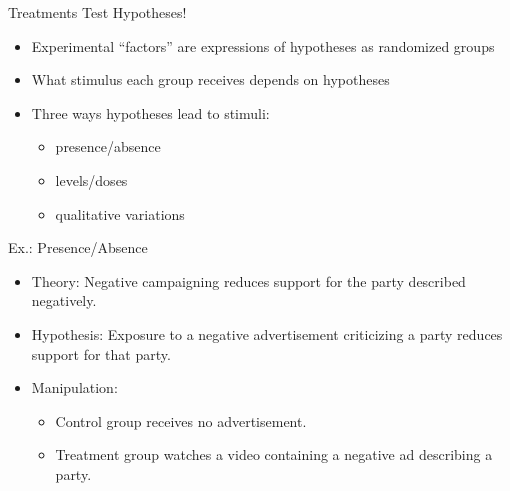 \documentclass[
  ignorenonframetext,
]{beamer}
\providecommand{\tightlist}{%
  \setlength{\itemsep}{0pt}\setlength{\parskip}{0pt}}
\begin{document}
\begin{frame}{Treatments Test Hypotheses!}
\protect\hypertarget{treatments-test-hypotheses}{}
\begin{itemize}
\tightlist
\item
  Experimental ``factors'' are expressions of hypotheses as randomized
  groups
\item
  What stimulus each group receives depends on hypotheses
\item
  Three ways hypotheses lead to stimuli:

  \begin{itemize}
  \tightlist
  \item
    presence/absence
  \item
    levels/doses
  \item
    qualitative variations
  \end{itemize}
\end{itemize}
\end{frame}

\begin{frame}{Ex.: Presence/Absence}
\protect\hypertarget{ex.-presenceabsence}{}
\begin{itemize}
\tightlist
\item
  Theory: Negative campaigning reduces support for the party described
  negatively.
\item
  Hypothesis: Exposure to a negative advertisement criticizing a party
  reduces support for that party.
\item
  Manipulation:

  \begin{itemize}
  \tightlist
  \item
    Control group receives no advertisement.
  \item
    Treatment group watches a video containing a negative ad describing
    a party.
  \end{itemize}
\end{itemize}
\end{frame}
\end{document}
